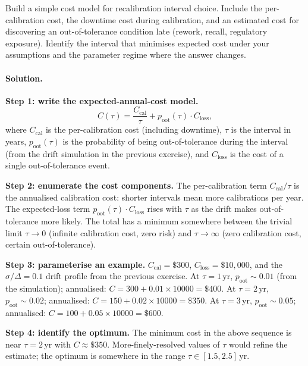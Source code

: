 \begin{exercise}
Build a simple cost model for recalibration interval choice. Include
the per-calibration cost, the downtime cost during calibration,
and an estimated cost for discovering an out-of-tolerance condition
late (rework, recall, regulatory exposure). Identify the interval
that minimises expected cost under your assumptions and the
parameter regime where the answer changes.

\paragraph{Solution.}
\textbf{Step 1: write the expected-annual-cost model.}
\[
C(\tau) = \frac{C_{\text{cal}}}{\tau} + p_{\text{oot}}(\tau) \cdot
C_{\text{loss}},
\]
where $C_{\text{cal}}$ is the per-calibration cost (including
downtime), $\tau$ is the interval in years, $p_{\text{oot}}(\tau)$
is the probability of being out-of-tolerance during the interval
(from the drift simulation in the previous exercise), and
$C_{\text{loss}}$ is the cost of a single out-of-tolerance event.

\textbf{Step 2: enumerate the cost components.} The
per-calibration term $C_{\text{cal}}/\tau$ is the annualised
calibration cost: shorter intervals mean more calibrations per
year. The expected-loss term $p_{\text{oot}}(\tau) \cdot
C_{\text{loss}}$ rises with $\tau$ as the drift makes
out-of-tolerance more likely. The total has a minimum somewhere
between the trivial limit $\tau \to 0$ (infinite calibration cost,
zero risk) and $\tau \to \infty$ (zero calibration cost, certain
out-of-tolerance).

\textbf{Step 3: parameterise an example.}
$C_{\text{cal}} = \$300$, $C_{\text{loss}} = \$10{,}000$, and the
$\sigma/\Delta = 0.1$ drift profile from the previous exercise. At
$\tau = 1 \,\text{yr}$, $p_{\text{oot}} \sim 0.01$ (from the
simulation); annualised: $C = 300 + 0.01 \times 10000 = \$400$.
At $\tau = 2 \,\text{yr}$, $p_{\text{oot}} \sim 0.02$; annualised:
$C = 150 + 0.02 \times 10000 = \$350$.
At $\tau = 3 \,\text{yr}$, $p_{\text{oot}} \sim 0.05$; annualised:
$C = 100 + 0.05 \times 10000 = \$600$.

\textbf{Step 4: identify the optimum.} The minimum cost in the
above sequence is near $\tau = 2 \,\text{yr}$ with $C \approx
\$350$. More-finely-resolved values of $\tau$ would refine the
estimate; the optimum is somewhere in the range $\tau \in
[1.5, 2.5] \,\text{yr}$.


\end{exercise}
